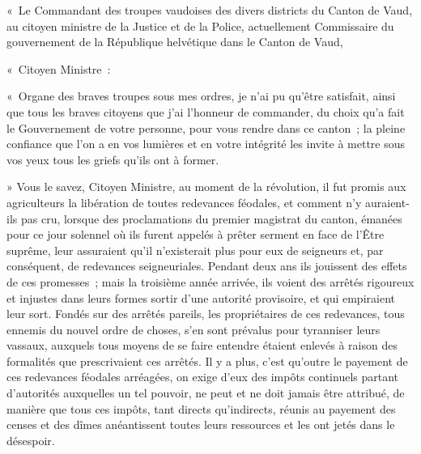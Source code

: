 \documentclass[french,twoside]{book} %
\newenvironment{quoteblock}%
  {\begin{quoting}}
  {\end{quoting}}
\newenvironment{quotebar}{%
    \def\FrameCommand{{\color{rubric!10!}\vrule width 0.5em} \hspace{0.9em}}%
    \def\OuterFrameSep{\itemsep} %
    \MakeFramed {\advance\hsize-\width \FrameRestore}
  }%
  {%
    \endMakeFramed
  }
\renewenvironment{quoteblock}%
  {%
    \savenotes
    \setstretch{0.9}
    \normalfont
    \begin{quotebar}
  }
  {%
    \end{quotebar}
    \spewnotes
  }
\begin{document}
\begin{quoteblock}
 \noindent « Le Commandant des troupes vaudoises des divers districts du Canton de Vaud, au citoyen ministre de la Justice et de la Police, actuellement Commissaire du gouvernement de la République helvétique dans le Canton de Vaud,\par
 « Citoyen Ministre :\par
 « Organe des braves troupes sous mes ordres, je n’ai pu qu’être satisfait, ainsi que tous les braves citoyens que j’ai l’honneur de commander, du choix qu’a fait le Gouvernement de votre personne, pour vous rendre dans ce canton ; la pleine confiance que l’on a en vos lumières et en votre intégrité les invite à mettre sous vos yeux tous les griefs qu’ils ont à former.\par
 » Vous le savez, Citoyen Ministre, au moment de la révolution, il fut promis aux agriculteurs la libération de toutes redevances féodales, et comment n’y auraient-ils pas cru, lorsque des proclamations du premier magistrat du canton, émanées pour ce jour solennel où ils furent appelés à prêter serment en face de l’Être suprême, leur assuraient qu’il n’existerait plus pour eux de seigneurs et, par conséquent, de redevances seigneuriales. Pendant deux ans ils jouissent des effets de ces promesses ; mais la troisième année arrivée, ils voient des arrêtés rigoureux et injustes dans leurs formes sortir d’une autorité provisoire, et qui empiraient leur sort. Fondés sur des arrêtés pareils, les propriétaires de ces redevances, tous ennemis du nouvel ordre de choses, s’en sont prévalus pour tyranniser leurs vassaux, auxquels tous moyens de se faire entendre étaient enlevés à raison des formalités que prescrivaient ces arrêtés. Il y a plus, c’est qu’outre le payement de ces redevances féodales arréagées, on exige d’eux des impôts continuels partant d’autorités auxquelles un tel pouvoir, ne peut et ne doit jamais être attribué, de manière que tous ces impôts, tant directs qu’indirects, réunis au payement des censes et des dîmes anéantissent toutes leurs ressources et les ont jetés dans le désespoir.\par

\end{quoteblock}
\end{document}
